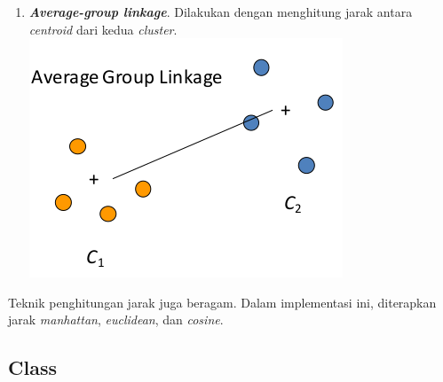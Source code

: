 \documentclass[11pt]{article}
\makeatletter
\def\maxwidth{\ifdim\Gin@nat@width>\linewidth\linewidth
    \else\Gin@nat@width\fi}
\let\Oldincludegraphics\includegraphics
\renewcommand{\includegraphics}[1]{\Oldincludegraphics[width=.8\maxwidth]{#1}}
\makeatother
\begin{document}
\begin{enumerate}
\item
  \textbf{\emph{Average-group linkage}}. Dilakukan dengan menghitung
  jarak antara \emph{centroid} dari kedua \emph{cluster}.
  \includegraphics{img/average_group.png}
\end{enumerate}

Teknik penghitungan jarak juga beragam. Dalam implementasi ini,
diterapkan jarak \emph{manhattan}, \emph{euclidean}, dan \emph{cosine}.

    \subsection{Class}\label{class}
\end{document}

